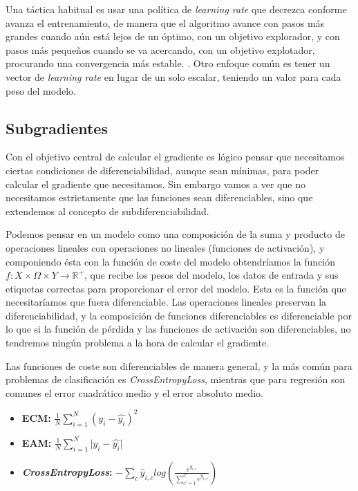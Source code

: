 Una táctica habitual es usar una política de \textit{learning rate} que decrezca conforme avanza el entrenamiento, de manera que el algoritmo avance con pasos más grandes cuando aún está lejos de un óptimo, con un objetivo explorador, y con pasos más pequeños cuando se va acercando, con un objetivo explotador, procurando una convergencia más estable. \cite{GoodFellowBook}. Otro enfoque común es tener un vector de \textit{learning rate} en lugar de un solo escalar, teniendo un valor para cada peso del modelo. 





\subsection{Subgradientes} \label{sec:subgrad}

Con el objetivo central de calcular el gradiente es lógico pensar que necesitamos ciertas condiciones de diferenciabilidad, aunque sean mínimas, para poder calcular el gradiente que necesitamos. Sin embargo vamos a ver que no necesitamos estrictamente que las funciones sean diferenciables, sino que extendemos al concepto de subdiferenciabilidad.

Podemos pensar en un modelo como una composición de la suma y producto de operaciones lineales con operaciones no lineales (funciones de activación), y componiendo ésta con la función de coste del modelo obtendríamos la función $f: X \times \Omega \times Y \rightarrow \mathbb{R^+}$, que recibe los pesos del modelo, los datos de entrada y sus etiquetas correctas para proporcionar el error del modelo. Esta es la función que necesitaríamos que fuera diferenciable. Las operaciones lineales preservan la diferenciabilidad, y la composición de funciones diferenciables es diferenciable por lo que si la función de pérdida y las funciones de activación son diferenciables, no tendremos ningún problema a la hora de calcular el gradiente.

Las funciones de coste son diferenciables de manera general, y la más común para problemas de clasificación es \textit{CrossEntropyLoss}, mientras que para regresión son comunes el error cuadrático medio y el error absoluto medio.

\begin{itemize}

    \item \textbf{ECM:} $\frac{1}{N} \sum_{i=1}^N \left (y_i - \hat{y_i} \right ) ^2$ 

    \item \textbf{EAM:} $\frac{1}{N} \sum_{i=1}^N \lvert y_i - \hat{y_i} \rvert$ 	

    \item \textbf{\textit{CrossEntropyLoss}:} $  - \sum_c \hat{y}_{i,c} log(\frac{e^{y_{i,c}}}{\sum_{c'=1}^C e^{y_{i,c'}}})$
\end{itemize}

